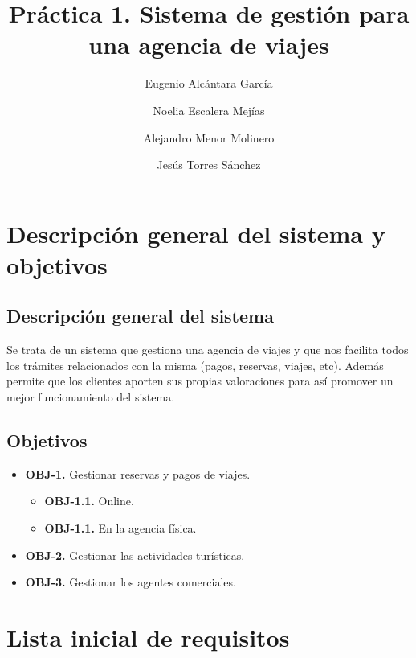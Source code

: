 \documentclass{article}
\title{Práctica 1. Sistema de gestión para una agencia de viajes}
\author{Eugenio Alcántara García\\
		\and Noelia Escalera Mejías\\
		\and Alejandro Menor Molinero\\
		\and Jesús Torres Sánchez}
\begin{document}
	\maketitle
	\section{Descripción general del sistema y objetivos}
	\subsection{Descripción general del sistema}
	Se trata de un sistema que gestiona una agencia de viajes y que nos facilita todos los trámites relacionados con la misma (pagos, reservas, viajes, etc). Además permite que los clientes aporten sus propias valoraciones para así promover un mejor funcionamiento del sistema.
	\subsection{Objetivos}
	\begin{itemize}
		\item \textbf{OBJ-1.} Gestionar reservas y pagos de viajes.
		\begin{itemize}
			\item \textbf{OBJ-1.1.} Online.
			\item \textbf{OBJ-1.1.} En la agencia física.
		\end{itemize}
		\item \textbf{OBJ-2.} Gestionar las actividades turísticas.
		\item \textbf{OBJ-3.} Gestionar los agentes comerciales.	
	\end{itemize}
	\section{Lista inicial de requisitos}
\end{document}
